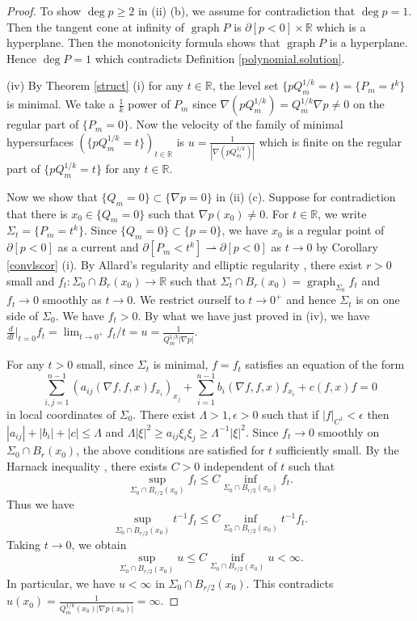 \documentclass[pdflatex,sn-mathphys-num]{sn-jnl}%
\theoremstyle{thmstyleone}%
\theoremstyle{thmstyletwo}%
\theoremstyle{thmstylethree}%
\newcommand{\R}{\mathbb{R}}
\DeclareMathOperator{\graph}{graph}
\begin{document}
\begin{proof}
	To show $\deg p\ge 2$ in (ii) (b), we assume for contradiction that $\deg p=1$. Then the tangent cone at infinity of $\graph P$ is $\partial[p <0]\times \R$ which is a hyperplane. Then the monotonicity formula \cite[Theorem 17.6]{Sim} shows that $\graph P$ is a hyperplane. Hence $\deg P=1$ which contradicts Definition \ref{polynomial.solution}.
	
	(iv) 
	By Theorem \ref{struct} (i) for any $t\in\R$, the level set $\{p Q_m^{1/k}=t\}=\{P_m=t^k\}$ is minimal. We take a $\frac{1}{k}$ power of $P_m$ since $\nabla (p Q_m^{1/k})=Q_m^{1/k}\nabla p \neq 0$ on the regular part of $\{P_m =0\}$. Now the velocity of the family of minimal hypersurfaces $(\{p Q_m^{1/k}=t\})_{t\in\R}$ is $u=\frac{1}{|\nabla (p Q_m^{1/k})|}$ which is finite on the regular part of $\{p Q_m^{1/k}=t\}$ for any $t\in \R$.
	
	Now we show that $\{Q_m=0\}\subset \{\nabla p=0\}$ in (ii) (c). Suppose for contradiction that there is $x_0\in \{Q_m=0\}$ such that $\nabla p(x_0)\neq0$. For $t\in\R$, we write $\Sigma_t=\{P_m=t^k\}$. Since $\{Q_m=0\}\subset\{p=0\}$, we have $x_0$ is a regular point of $\partial[p<0]$ as a current and $\partial[P_m<t^k]\rightharpoonup\partial[p<0]$ as $t\to0$ by Corollary \ref{convlscor} (i). By Allard's regularity \cite[Theorem 24.2]{Sim} and elliptic regularity \cite{GT}, there exist $r>0$ small and $f_t:\Sigma_0\cap B_r(x_0)\to \R$ such that $\Sigma_t\cap B_r(x_0)=\graph_{\Sigma_0}f_t$ and $f_t\to0$ smoothly as $t\to0$. We restrict ourself to $t\to 0^+$ and hence $\Sigma_t$ is on one side of $\Sigma_0$. We have $f_t>0$. By what we have just proved in (iv), we have $\frac{d}{dt}|_{t=0}f_t=\lim_{t\to0^+} f_t/t=u=\frac{1}{Q_m^{1/k}|\nabla p|}$. 
	
	For any $t>0$ small, since $\Sigma_t$ is minimal, $f=f_t$ satisfies an equation of the form \[\sum_{i,j=1}^{n-1}(a_{ij}(\nabla f,f,x)f_{x_i})_{x_j}+\sum_{i=1}^{n-1}b_i(\nabla f,f,x)f_{x_i}+c(f,x)f=0\] in local coordinates of $\Sigma_0$. There exist $\Lambda>1,\epsilon>0$ such that if $|f|_{C^1}<\epsilon$ then $|a_{ij}|+|b_i|+|c|\le \Lambda$ and $\Lambda|\xi|^2\ge a_{ij}\xi_i\xi_j\ge \Lambda^{-1}|\xi|^2$. Since $f_t\to0$ smoothly on $\Sigma_0\cap B_{r}(x_0)$, the above conditions are satisfied for $t$ sufficiently small.
	By the Harnack inequality \cite[Theorem 8.20]{GT}, there exists $C>0$ independent of $t$ such that 
	\[\sup_{\Sigma_0\cap B_{r/2}(x_0)}f_t\le C\inf_{\Sigma_0\cap B_{r/2}(x_0)} f_t.\] Thus we have
	\[\sup_{\Sigma_0\cap B_{r/2}(x_0)}t^{-1}f_t\le C\inf_{\Sigma_0\cap B_{r/2}(x_0)}t^{-1}f_t.\]Taking $t\to 0$, we obtain \[\sup_{\Sigma_0\cap B_{r/2}(x_0)} u\le C\inf_{\Sigma_0\cap B_{r/2}(x_0)}u<\infty.\]
	In particular, we have $u<\infty$ in $\Sigma_0\cap B_{r/2}(x_0)$. This contradicts $u(x_0)=\frac{1}{Q_m^{1/k}(x_0)|\nabla p(x_0)|}=\infty$.
	

\end{proof}
\end{document}
